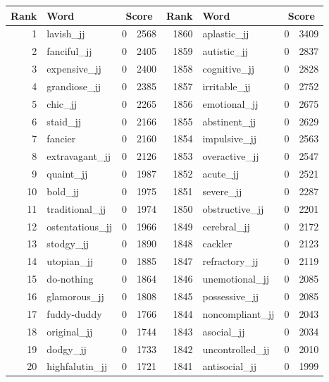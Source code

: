 \begin{table}[tbp]
    \begin{tabular}{| rlr@{.}l | rlr@{.}l |}
    \hline
    \textbf{Rank} & \textbf{Word} & \multicolumn{2}{c|}{\textbf{Score}} & \textbf{Rank} & \textbf{Word} & \multicolumn{2}{c|}{\textbf{Score}} \\
    \hline
    1 & lavish\_jj & 0 & 2568    &    1860 & aplastic\_jj & 0 & 3409 \\
    2 & fanciful\_jj & 0 & 2405    &    1859 & autistic\_jj & 0 & 2837 \\
    3 & expensive\_jj & 0 & 2400    &    1858 & cognitive\_jj & 0 & 2828 \\
    4 & grandiose\_jj & 0 & 2385    &    1857 & irritable\_jj & 0 & 2752 \\
    5 & chic\_jj & 0 & 2265    &    1856 & emotional\_jj & 0 & 2675 \\
    6 & staid\_jj & 0 & 2166    &    1855 & abstinent\_jj & 0 & 2629 \\
    7 & fancier & 0 & 2160    &    1854 & impulsive\_jj & 0 & 2563 \\
    8 & extravagant\_jj & 0 & 2126    &    1853 & overactive\_jj & 0 & 2547 \\
    9 & quaint\_jj & 0 & 1987    &    1852 & acute\_jj & 0 & 2521 \\
    10 & bold\_jj & 0 & 1975    &    1851 & severe\_jj & 0 & 2287 \\
    11 & traditional\_jj & 0 & 1974    &    1850 & obstructive\_jj & 0 & 2201 \\
    12 & ostentatious\_jj & 0 & 1966    &    1849 & cerebral\_jj & 0 & 2172 \\
    13 & stodgy\_jj & 0 & 1890    &    1848 & cackler & 0 & 2123 \\
    14 & utopian\_jj & 0 & 1885    &    1847 & refractory\_jj & 0 & 2119 \\
    15 & do-nothing & 0 & 1864    &    1846 & unemotional\_jj & 0 & 2085 \\
    16 & glamorous\_jj & 0 & 1808    &    1845 & possessive\_jj & 0 & 2085 \\
    17 & fuddy-duddy & 0 & 1766    &    1844 & noncompliant\_jj & 0 & 2043 \\
    18 & original\_jj & 0 & 1744    &    1843 & asocial\_jj & 0 & 2034 \\
    19 & dodgy\_jj & 0 & 1733    &    1842 & uncontrolled\_jj & 0 & 2010 \\
    20 & highfalutin\_jj & 0 & 1721    &    1841 & antisocial\_jj & 0 & 1999 \\

\end{tabular}
\end{table}
